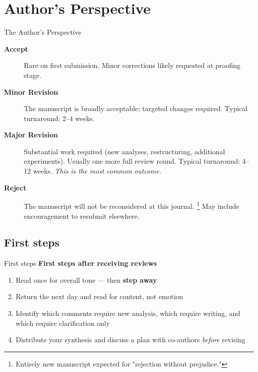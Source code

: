 \documentclass{beamer}
\begin{document}
\section{Author's Perspective}
\begin{frame}{The Author's Perspective}

  \footnotesize
  \begin{description}
    \item[\textbf{Accept}]
      Rare on first submission. Minor corrections likely requested at proofing stage.
    \item[\textbf{Minor Revision}]
      The manuscript is broadly acceptable; targeted changes
      required. Typical turnaround: 2--4 weeks.
    \item[\textbf{Major Revision}]
      Substantial work required (new analyses, restructuring,
      additional experiments). Usually one more full review round.
      Typical turnaround: 4--12 weeks.
      \emph{This is the most common outcome.}
    \item[\textbf{Reject}]
      The manuscript will not be reconsidered at this journal.%
      \footnote{\scriptsize Entirely new manuscript expected for "rejection without prejudice." }
      May include encouragement to resubmit elsewhere.
  \end{description}
\end{frame}


\subsection{First steps}
\begin{frame}{First steps}
  \textbf{First steps after receiving reviews}
  \begin{enumerate}
    \item Read once for overall tone --- then \textbf{step away}
    \item Return the next day and read for content, not emotion
    \item Identify which comments require new analysis, which
      require writing, and which require clarification only
    \item Distribute your synthesis and discuss a plan with co-authors \emph{before} revising
  \end{enumerate}
\end{frame}

\end{document}
